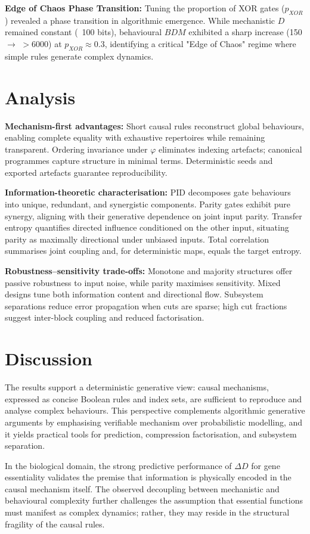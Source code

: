 \documentclass[11pt]{article}
\begin{document}
\textbf{Edge of Chaos Phase Transition:} Tuning the proportion of XOR gates ($p_{XOR}$) revealed a phase transition in algorithmic emergence. While mechanistic $D$ remained constant (~100 bits), behavioural $BDM$ exhibited a sharp increase (150 $\to$ $>6000$) at $p_{XOR} \approx 0.3$, identifying a critical "Edge of Chaos" regime where simple rules generate complex dynamics.


\section{Analysis}
\textbf{Mechanism-first advantages:} Short causal rules reconstruct global behaviours, enabling complete equality with exhaustive repertoires while remaining transparent. Ordering invariance under $\varphi$ eliminates indexing artefacts; canonical programmes capture structure in minimal terms. Deterministic seeds and exported artefacts guarantee reproducibility.

\textbf{Information-theoretic characterisation:} PID decomposes gate behaviours into unique, redundant, and synergistic components. Parity gates exhibit pure synergy, aligning with their generative dependence on joint input parity. Transfer entropy quantifies directed influence conditioned on the other input, situating parity as maximally directional under unbiased inputs. Total correlation summarises joint coupling and, for deterministic maps, equals the target entropy.

\textbf{Robustness--sensitivity trade-offs:} Monotone and majority structures offer passive robustness to input noise, while parity maximises sensitivity. Mixed designs tune both information content and directional flow. Subsystem separations reduce error propagation when cuts are sparse; high cut fractions suggest inter-block coupling and reduced factorisation.

\section{Discussion}
The results support a deterministic generative view: causal mechanisms, expressed as concise Boolean rules and index sets, are sufficient to reproduce and analyse complex behaviours. This perspective complements algorithmic generative arguments by emphasising verifiable mechanism over probabilistic modelling, and it yields practical tools for prediction, compression factorisation, and subsystem separation.

In the biological domain, the strong predictive performance of $\Delta D$ for gene essentiality validates the premise that information is physically encoded in the causal mechanism itself. The observed decoupling between mechanistic and behavioural complexity further challenges the assumption that essential functions must manifest as complex dynamics; rather, they may reside in the structural fragility of the causal rules.
\end{document}
